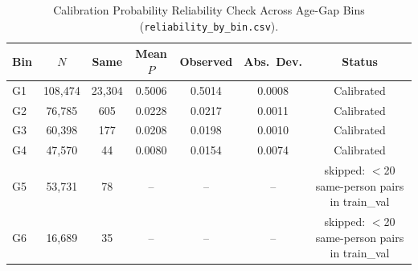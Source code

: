 \documentclass[journal]{IEEEtran}
\begin{document}
\begin{table}[h]
\centering
\caption{Calibration Probability Reliability Check Across Age-Gap Bins (\texttt{reliability\_by\_bin.csv}).}
\label{tab:s2_rel}
\scriptsize
\setlength{\tabcolsep}{3.0pt}
\begin{tabular}{@{}lcccccc@{}}
\toprule
\textbf{Bin} & \textbf{$N$} & \textbf{Same} & \textbf{Mean $P$} & \textbf{Observed} & \textbf{Abs.\ Dev.} & \textbf{Status} \\
\midrule
G1 & 108,474 & 23,304 & 0.5006 & 0.5014 & 0.0008 & Calibrated \\
G2 & 76,785 & 605 & 0.0228 & 0.0217 & 0.0011 & Calibrated \\
G3 & 60,398 & 177 & 0.0208 & 0.0198 & 0.0010 & Calibrated \\
G4 & 47,570 & 44 & 0.0080 & 0.0154 & 0.0074 & Calibrated \\
G5 & 53,731 & 78 & -- & -- & -- & skipped: $<$20 same-person pairs in train\_val \\
G6 & 16,689 & 35 & -- & -- & -- & skipped: $<$20 same-person pairs in train\_val \\
\bottomrule
\end{tabular}
\end{table}
\end{document}
